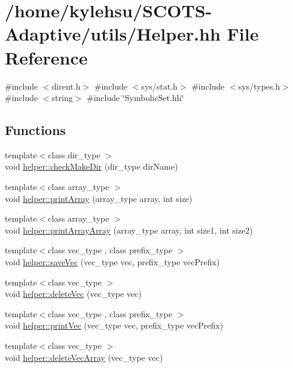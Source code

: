 \hypertarget{Helper_8hh}{}\section{/home/kylehsu/\+S\+C\+O\+T\+S-\/\+Adaptive/utils/\+Helper.hh File Reference}
\label{Helper_8hh}
{\ttfamily \#include $<$dirent.\+h$>$}\newline
{\ttfamily \#include $<$sys/stat.\+h$>$}\newline
{\ttfamily \#include $<$sys/types.\+h$>$}\newline
{\ttfamily \#include $<$string$>$}\newline
{\ttfamily \#include \char`\"{}Symbolic\+Set.\+hh\char`\"{}}\newline
\subsection*{Functions}
\begin{DoxyCompactItemize}
\item 
{\footnotesize template$<$class dir\+\_\+type $>$ }\\void \hyperlink{Helper_8hh_a54c684ce784017d4c61e9fc7a179be67}{helper\+::check\+Make\+Dir} (dir\+\_\+type dir\+Name)
\item 
{\footnotesize template$<$class array\+\_\+type $>$ }\\void \hyperlink{Helper_8hh_ad3a9b9a5d8b46962dae72719f691201c}{helper\+::print\+Array} (array\+\_\+type array, int size)
\item 
{\footnotesize template$<$class array\+\_\+type $>$ }\\void \hyperlink{Helper_8hh_a4c64e0acf408f16a166c998a80fc548d}{helper\+::print\+Array\+Array} (array\+\_\+type array, int size1, int size2)
\item 
{\footnotesize template$<$class vec\+\_\+type , class prefix\+\_\+type $>$ }\\void \hyperlink{Helper_8hh_afea778bfb31cba93e003c382413c36b2}{helper\+::save\+Vec} (vec\+\_\+type vec, prefix\+\_\+type vec\+Prefix)
\item 
{\footnotesize template$<$class vec\+\_\+type $>$ }\\void \hyperlink{Helper_8hh_a4cfbf4be07fc1d320df3c06ab77ff469}{helper\+::delete\+Vec} (vec\+\_\+type vec)
\item 
{\footnotesize template$<$class vec\+\_\+type , class prefix\+\_\+type $>$ }\\void \hyperlink{Helper_8hh_a33cb7ae024bddfc7874b8aaa80d46f4b}{helper\+::print\+Vec} (vec\+\_\+type vec, prefix\+\_\+type vec\+Prefix)
\item 
{\footnotesize template$<$class vec\+\_\+type $>$ }\\void \hyperlink{Helper_8hh_a204cd701ae182be7b10e2017e259285b}{helper\+::delete\+Vec\+Array} (vec\+\_\+type vec)
\end{DoxyCompactItemize}


